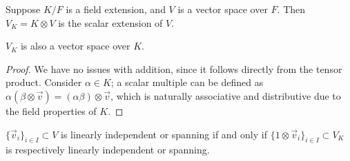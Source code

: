 \begin{definition}
    Suppose \(K/F\) is a field extension, and \(V\) is a vector space over \(F\).
    Then \(V_K = K \otimes V\) is the scalar extension of \(V\).
\end{definition}
\begin{lemma}
    \(V_K\) is also a vector space over \(K\).
\end{lemma}
\begin{proof}
    We have no issues with addition, since it follows directly from the tensor product.
    Consider \(\alpha \in K\); a scalar multiple can be defined as
    \(\alpha(\beta\otimes\vec{v}) = (\alpha\beta)\otimes\vec{v}\),
    which is naturally associative and distributive due to the field properties of \(K\).
\end{proof}
\begin{proposition}\label{prop:field-ext-lin-dep}\label{prop:field-ext-span}
    \({\{\vec{v}_i\}}_{i \in I} \subset V\) is linearly independent or spanning
    if and only if \({\{1\otimes\vec{v}_i\}}_{i \in I} \subset V_K\)
    is respectively linearly independent or spanning.
\end{proposition}

